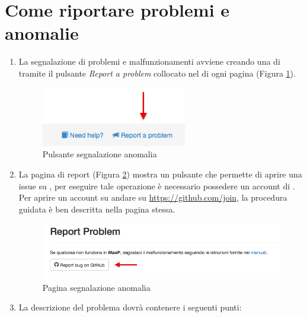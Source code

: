 \clearpage
\section{Come riportare problemi e anomalie}
	\begin{enumerate}
		
		\item La segnalazione di problemi e malfunzionamenti avviene creando una  di  tramite il pulsante \emph{Report a problem} collocato nel  di ogni pagina (Figura \ref{fig:probelmReportButton}).

		\begin{figure}[H]
				\label{fig:showpage}
					\centering \includegraphics[width=0.6\textwidth]{img/probelmReportButton.png}
				\caption{\label{fig:probelmReportButton} Pulsante segnalazione anomalia}
		\end{figure}

		\item La pagina di report (Figura \ref{fig:paginaProbelmReport}) mostra un pulsante che permette di aprire una issue su , per eseguire tale operazione è necessario possedere un account di . Per aprire un account su  andare su \url{https://github.com/join}, la procedura guidata è  ben descritta nella pagina stessa.

		\begin{figure}[H]
				\label{fig:showpage}
					\centering \includegraphics[width=1\textwidth]{img/paginaProbelmReport.png}
				\caption{\label{fig:paginaProbelmReport} Pagina segnalazione anomalia}
		\end{figure}

		\item La descrizione del problema dovrà contenere i seguenti punti:


\end{enumerate}

